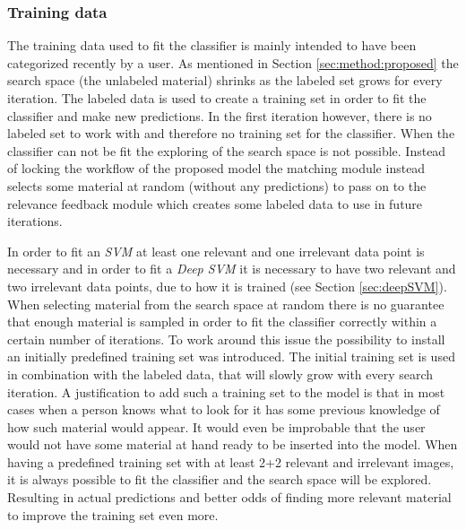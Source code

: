 \subsubsection{Training data}
\label{sec:method:proposed:matching:training}
The training data used to fit the classifier is mainly intended to have been categorized recently by a user. As mentioned in Section \ref{sec:method:proposed} the search space (the  unlabeled material) shrinks as the labeled set grows for every iteration. The labeled data is used to create a training set in order to fit the classifier and make new predictions. 
In the first iteration however, there is no labeled set to work with and therefore no training set for the classifier. When the classifier can not be fit the exploring of the search space is not possible. Instead of locking the workflow of the proposed model the matching module instead selects some material at random (without any predictions) to pass on to the relevance feedback module which creates some labeled data to use in future iterations.

In order to fit an \emph{SVM} at least one relevant and one irrelevant data point is necessary and in order to fit a \emph{Deep SVM} it is necessary to have two relevant and two irrelevant data points, due to how it is trained (see Section \ref{sec:deepSVM}). When selecting material from the search space at random there is no guarantee that enough material is sampled in order to fit the classifier correctly within a certain number of iterations. 
To work around this issue the possibility to install an initially predefined training set was introduced. The initial training set is used in combination with the labeled data, that will slowly grow with every search iteration. A justification to add such a training set to the model is that in most cases when a person knows what to look for it has some previous knowledge of how such material would appear. It would even be improbable that the user would not have some material at hand ready to be inserted into the model. When having a predefined training set with at least 2+2 relevant and irrelevant images, it is always possible to fit the classifier and the search space will be explored. Resulting in actual predictions and better odds of finding more relevant material to improve the training set even more.

